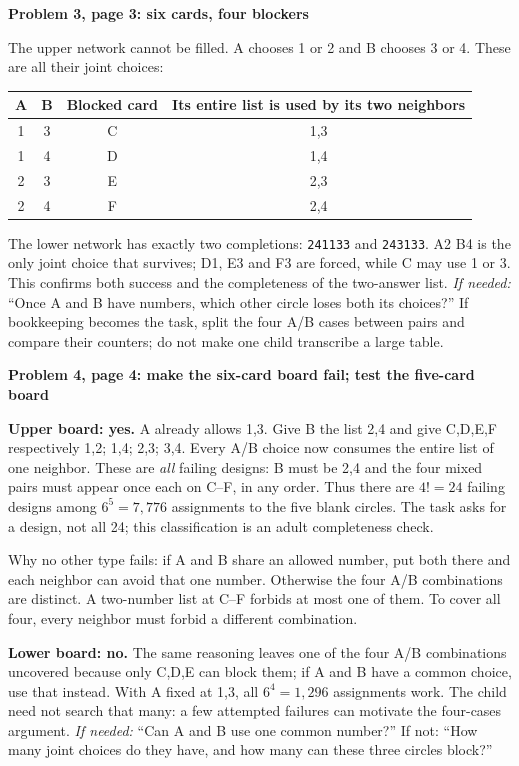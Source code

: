 \documentclass[10pt]{article}
\newcommand{\sub}[1]{\par\textbf{#1}\par}
\newcommand{\hint}[1]{\textit{If needed:} #1}
\newcommand{\word}[1]{\texttt{#1}}
\begin{document}
\sub{Problem 3, page 3: six cards, four blockers}
The upper network cannot be filled. A chooses 1 or 2 and B chooses 3 or 4. These are all their joint choices:
\begin{center}\renewcommand{\arraystretch}{1.2}
\begin{tabular}{cccc}
A & B & Blocked card & Its entire list is used by its two neighbors\\\midrule
1&3&C&1,3\\
1&4&D&1,4\\
2&3&E&2,3\\
2&4&F&2,4\\
\end{tabular}\end{center}
The lower network has exactly two completions: \word{241133} and \word{243133}. A2 B4 is the only joint choice that survives; D1, E3 and F3 are forced, while C may use 1 or 3. This confirms both success and the completeness of the two-answer list. \hint{``Once A and B have numbers, which other circle loses both its choices?''} If bookkeeping becomes the task, split the four A/B cases between pairs and compare their counters; do not make one child transcribe a large table.

\sub{Problem 4, page 4: make the six-card board fail; test the five-card board}
\textbf{Upper board: yes.} A already allows 1,3. Give B the list 2,4 and give C,D,E,F respectively 1,2; 1,4; 2,3; 3,4. Every A/B choice now consumes the entire list of one neighbor. These are \emph{all} failing designs: B must be 2,4 and the four mixed pairs must appear once each on C--F, in any order. Thus there are $4!=24$ failing designs among $6^5=7{,}776$ assignments to the five blank circles. The task asks for a design, not all 24; this classification is an adult completeness check.

Why no other type fails: if A and B share an allowed number, put both there and each neighbor can avoid that one number. Otherwise the four A/B combinations are distinct. A two-number list at C--F forbids at most one of them. To cover all four, every neighbor must forbid a different combination.

\textbf{Lower board: no.} The same reasoning leaves one of the four A/B combinations uncovered because only C,D,E can block them; if A and B have a common choice, use that instead. With A fixed at 1,3, all $6^4=1{,}296$ assignments work. The child need not search that many: a few attempted failures can motivate the four-cases argument. \hint{``Can A and B use one common number?'' If not: ``How many joint choices do they have, and how many can these three circles block?''}
\end{document}
